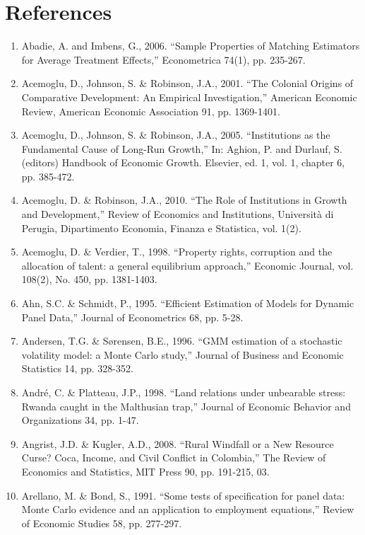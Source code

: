 \documentclass[12pt,a4paper,english]{article}%
\begin{document}
\section*{References}
\begin{enumerate} \footnotesize
\item Abadie, A. and Imbens, G., 2006. ``Sample Properties of Matching Estimators for Average Treatment Effects,'' Econometrica 74(1), pp. 235-267.
\item  Acemoglu, D., Johnson, S. \& Robinson, J.A., 2001. ``The Colonial Origins of Comparative Development: An Empirical Investigation,'' American Economic Review, American Economic Association 91, pp. 1369-1401.
\item Acemoglu, D., Johnson, S. \& Robinson, J.A., 2005. ``Institutions as the Fundamental Cause of Long-Run Growth,'' In: Aghion, P. and Durlauf, S. (editors) Handbook of Economic Growth. Elsevier, ed. 1, vol. 1, chapter 6, pp. 385-472.
\item Acemoglu, D. \& Robinson, J.A., 2010. ``The Role of Institutions in Growth and Development,'' Review of Economics and Institutions, Universit\`{a} di Perugia, Dipartimento Economia, Finanza e Statistica, vol. 1(2).
\item Acemoglu, D. \& Verdier, T., 1998. ``Property rights, corruption and the allocation of talent: a general equilibrium approach,'' Economic Journal, vol. 108(2), No. 450, pp. 1381-1403.
\item Ahn, S.C. \& Schmidt, P., 1995. ``Efficient Estimation of Models for Dynamic Panel Data,'' Journal of Econometrics 68, pp. 5-28.

\item Andersen, T.G. \& S\o rensen, B.E., 1996. ``GMM estimation of a stochastic volatility model: a Monte Carlo study,'' Journal of Business and Economic Statistics 14, pp. 328-352.

\item Andr\'{e}, C. \& Platteau, J.P., 1998. ``Land relations under unbearable stress: Rwanda caught in the Malthusian trap,'' Journal of Economic Behavior and Organizations 34, pp. 1-47.

\item Angrist, J.D. \& Kugler, A.D., 2008. ``Rural Windfall or a New Resource Curse? Coca, Income, and Civil Conflict in Colombia,'' The Review of Economics and Statistics, MIT Press 90, pp. 191-215, 03.

\item Arellano, M. \& Bond, S., 1991. ``Some tests of specification for panel data: Monte Carlo evidence and an application to employment equations,'' Review of Economic Studies 58, pp. 277-297.


\end{enumerate}
\end{document}
